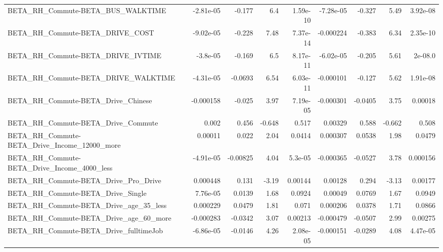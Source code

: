 \begin{tabular}{lrrrrrrrr}
BETA\_RH\_Commute-BETA\_BUS\_WALKTIME                  &   -2.81e-05 &       -0.177 &       6.4 & 1.59e-10 &  -7.28e-05 &      -0.327 &         5.49 &      3.92e-08 \\
BETA\_RH\_Commute-BETA\_DRIVE\_COST                    &   -9.02e-05 &       -0.228 &      7.48 & 7.37e-14 &  -0.000224 &      -0.383 &         6.34 &      2.35e-10 \\
BETA\_RH\_Commute-BETA\_DRIVE\_IVTIME                  &    -3.8e-05 &       -0.169 &       6.5 & 8.17e-11 &  -6.02e-05 &      -0.205 &         5.61 &       2e-08.0 \\
BETA\_RH\_Commute-BETA\_DRIVE\_WALKTIME                &   -4.31e-05 &      -0.0693 &      6.54 & 6.03e-11 &  -0.000101 &      -0.127 &         5.62 &      1.91e-08 \\
BETA\_RH\_Commute-BETA\_Drive\_Chinese                 &   -0.000158 &       -0.025 &      3.97 & 7.19e-05 &  -0.000301 &     -0.0405 &         3.75 &       0.00018 \\
BETA\_RH\_Commute-BETA\_Drive\_Commute                 &       0.002 &        0.456 &    -0.648 &    0.517 &    0.00329 &       0.588 &       -0.662 &         0.508 \\
BETA\_RH\_Commute-BETA\_Drive\_Income\_12000\_more       &     0.00011 &        0.022 &      2.04 &   0.0414 &   0.000307 &      0.0538 &         1.98 &        0.0479 \\
BETA\_RH\_Commute-BETA\_Drive\_Income\_4000\_less        &   -4.91e-05 &     -0.00825 &      4.04 &  5.3e-05 &  -0.000365 &     -0.0527 &         3.78 &      0.000156 \\
BETA\_RH\_Commute-BETA\_Drive\_Pro\_Drive               &    0.000448 &        0.131 &     -3.19 &  0.00144 &    0.00128 &       0.294 &        -3.13 &       0.00177 \\
BETA\_RH\_Commute-BETA\_Drive\_Single                  &    7.76e-05 &       0.0139 &      1.68 &   0.0924 &    0.00049 &      0.0769 &         1.67 &        0.0949 \\
BETA\_RH\_Commute-BETA\_Drive\_age\_35\_less             &    0.000229 &       0.0479 &      1.81 &    0.071 &   0.000206 &      0.0378 &         1.71 &        0.0866 \\
BETA\_RH\_Commute-BETA\_Drive\_age\_60\_more             &   -0.000283 &      -0.0342 &      3.07 &  0.00213 &  -0.000479 &     -0.0507 &         2.99 &       0.00275 \\
BETA\_RH\_Commute-BETA\_Drive\_fulltimeJob             &   -6.86e-05 &      -0.0146 &      4.26 & 2.08e-05 &  -0.000151 &     -0.0289 &         4.08 &      4.47e-05 \\

\end{tabular}
